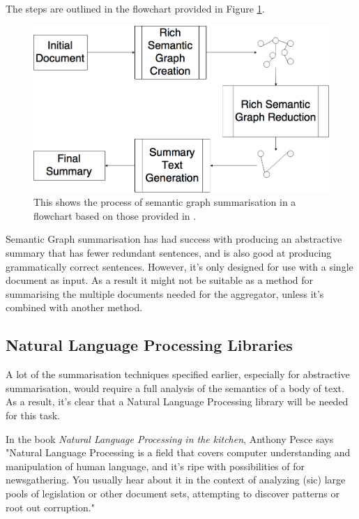 \documentclass[12pt]{article}
\begin{document}
The steps are outlined in the flowchart provided in Figure \ref{semanticGraphSummarisation}.

\begin{figure}[ht!]
  \centering
    \includegraphics[scale=0.4]{SemanticGraphSummarisation.png}
   \caption[A flowchart showing the process of semantic graph summarisation]{This shows the process of semantic graph summarisation in a flowchart based on those provided in  \cite{abstractiveTechniques, abstractiveTechniquesOriginal}.}
   \label{semanticGraphSummarisation}
\end{figure}

Semantic Graph summarisation has had success with producing an abstractive summary that has fewer redundant sentences, and is also good at producing grammatically correct sentences. However, it's only designed for use with a single document as input. As a result it might not be suitable as a method for summarising the multiple documents needed for the aggregator, unless it's combined with another method.

\subsection{Natural Language Processing Libraries} 

A lot of the summarisation techniques specified earlier, especially for abstractive summarisation, would require a full analysis of the semantics of a body of text. As a result, it's clear that a Natural Language Processing library will be needed for this task.

In the book \emph{Natural Language Processing in the kitchen}, Anthony Pesce says "Natural Language Processing is a field that covers computer understanding and manipulation of human language, and it's ripe with possibilities of for newsgathering. You usually hear about it in the context of analyzing (sic) large pools of legislation or other document sets, attempting to discover patterns or root out corruption."
\end{document}
